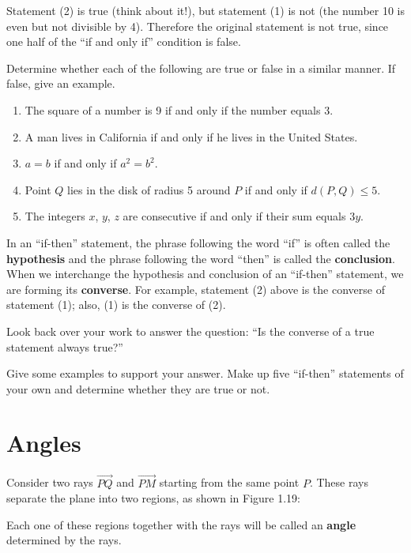 \documentclass[12pt]{book} %
\begin{document}
Statement (2) is true (think about it!), but statement (1) is not (the number 10 is even but not divisible by 4). Therefore the original statement is not true, since one half of the ``if and only if'' condition is false.

Determine whether each of the following are true or false in a similar manner. If false, give an example.
\begin{enumerate}
	\item[(a)] The square of a number is 9 if and only if the number equals 3.
	\item[(b)] A man lives in California if and only if he lives in the United States.
	\item[(c)] $a=b$ if and only if $a^2=b^2$.
	\item[(d)] Point $Q$ lies in the disk of radius 5 around $P$ if and only if $d(P,Q)\le 5$.
	\item[(e)] The integers $x$, $y$, $z$ are consecutive if and only if their sum equals $3y$.
\end{enumerate}

In an ``if-then'' statement, the phrase following the word ``if'' is often called the \textbf{hypothesis} and the phrase following the word ``then'' is called the \textbf{conclusion}. When we interchange the hypothesis and conclusion of an ``if-then'' statement, we are forming its \textbf{converse}. For example, statement (2) above is the converse of statement (1); also, (1) is the converse of (2).

Look back over your work to answer the question: ``Is the converse of a true statement always true?''

Give some examples to support your answer. Make up five ``if-then'' statements of your own and determine whether they are true or not.

\section{Angles}

Consider two rays $\overrightarrow{PQ}$ and $\overrightarrow{PM}$ starting from the same point $P$. These rays separate the plane into two regions, as shown in Figure 1.19:


Each one of these regions together with the rays will be called an \textbf{angle} determined by the rays.
\end{document}
